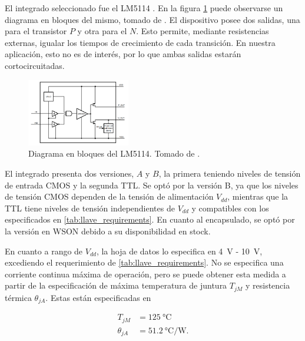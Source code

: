 El integrado seleccionado fue el LM5114 \cite{LM5114_datasheet}. En la figura
\ref{fig:lm5114_block_diagram} puede observarse un diagrama en bloques del
mismo, tomado de \cite{LM5114_datasheet}. El dispositivo posee dos salidas, una
para el transistor $P$ y otra para el $N$. Esto permite, mediante resistencias
externas, igualar los tiempos de crecimiento de cada transición. En nuestra
aplicación, esto no es de interés, por  lo que ambas salidas estarán
cortocircuitadas.

\begin{figure}[tbp]
    \centering
    \includegraphics[width=0.4\textwidth]{images/lm5114_block_diagram.png}
    \caption{Diagrama en bloques del LM5114. Tomado de \cite{LM5114_datasheet}.}
    \label{fig:lm5114_block_diagram}
\end{figure}

El integrado presenta dos versiones, $A$ y $B$, la primera teniendo niveles de
tensión de entrada CMOS y la segunda TTL.  Se optó por la versión B, ya que los
niveles de tensión CMOS dependen de la tensión de alimentación $V_{dd}$,
mientras que la TTL tiene niveles de tensión independientes de $V_{dd}$ y
compatibles con los especificados en \ref{tab:llave_requirements}. En cuanto al
encapsulado, se optó por la versión en WSON debido a su disponibilidad en
stock.

En cuanto a rango de $V_{dd}$, la hoja de datos lo especifica en \qty{4}{\volt}
- \qty{10}{\volt}, excediendo el requerimiento de \ref{tab:llave_requirements}.
No se especifica una corriente continua máxima de operación, pero se puede
obtener esta medida a partir de la especificación de máxima temperatura de
juntura $T_{jM}$ y resistencia térmica $\theta_{jA}$. Estas están especificadas en

\begin{equation}
    \begin{aligned}
        T_{jM} & = \qty{125}{\celsius} \\
        \theta_{jA} &= \qty[per-mode=fraction]{51.2}{\celsius\per\watt}. \\
    \end{aligned}
\end{equation}

